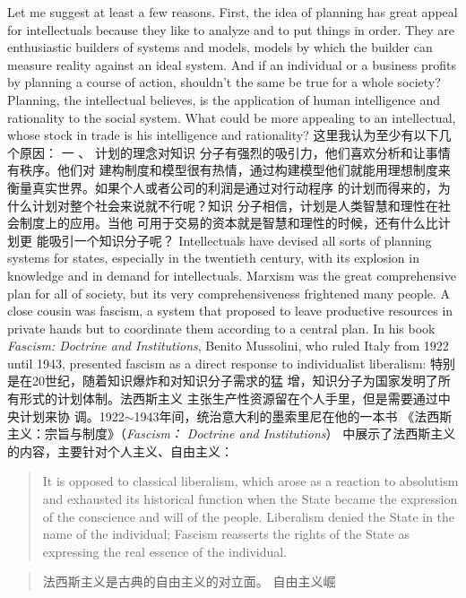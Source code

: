 \begin{paracol}{2}
\switchcolumn*
Let me suggest at least a few reasons. First, the idea of planning has great appeal for intellectuals because they like to analyze and to put things in order. They are enthusiastic builders of
systems and models, models by which the builder can measure
reality against an ideal system. And if an individual or a business profits by planning a course of action, shouldn't the same
be true for a whole society? Planning, the intellectual believes,
is the application of human intelligence and rationality to the
social system. What could be more appealing to an intellectual,
whose stock in trade is his intelligence and rationality?
\switchcolumn
这里我认为至少有以下几个原因： 一 、 计划的理念对知识
分子有强烈的吸引力，他们喜欢分析和让事情有秩序。他们对
建构制度和模型很有热情，通过构建模型他们就能用理想制度来衡量真实世界。如果个人或者公司的利润是通过对行动程序
的计划而得来的，为什么计划对整个社会来说就不行呢？知识
分子相信，计划是人类智慧和理性在社会制度上的应用。当他
可用于交易的资本就是智慧和理性的时候，还有什么比计划更
能吸引一个知识分子呢？
\switchcolumn*
Intellectuals have devised all sorts of planning systems for
states, especially in the twentieth century, with its explosion in
knowledge and in demand for intellectuals. Marxism was the
great comprehensive plan for all of society, but its very comprehensiveness frightened many people. A close cousin was fascism, a system that proposed to leave productive resources in
private hands but to coordinate them according to a central
plan. In his book \textit{Fascism: Doctrine and Institutions}, Benito Mussolini, who ruled Italy from 1922 until 1943, presented fascism
as a direct response to individualist liberalism:
\switchcolumn
特别是在20世纪，随着知识爆炸和对知识分子需求的猛
增，知识分子为国家发明了所有形式的计划体制。法西斯主义
主张生产性资源留在个人手里，但是需要通过中央计划来协
调。1922$\sim$1943年间，统治意大利的墨索里尼在他的一本书
《法西斯主义：宗旨与制度》（\textit{Fascism： Doctrine and Institu­tions}） 中展示了法西斯主义的内容，主要针对个人主义、自由主义：
\switchcolumn*
\begin{quote}
It is opposed to classical liberalism, which arose as a reaction to
absolutism and exhausted its historical function when the State
became the expression of the conscience and will of the people.
Liberalism denied the State in the name of the individual; Fascism reasserts the rights of the State as expressing the real essence
of the individual.
\end{quote}
\switchcolumn
\begin{quote}
法西斯主义是古典的自由主义的对立面。 自由主义崛

\end{quote}
\end{paracol}
